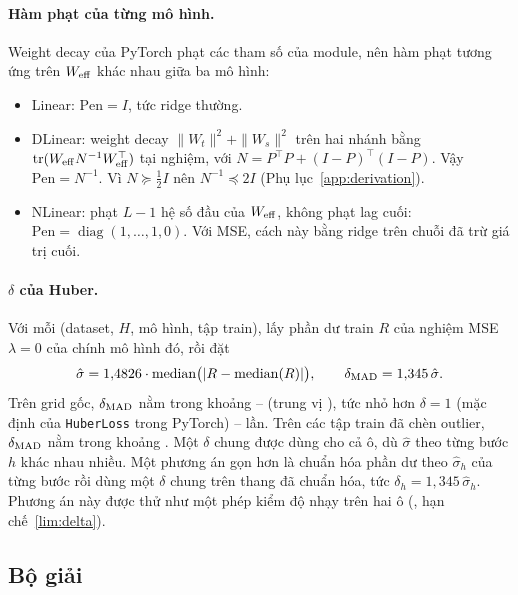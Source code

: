 \paragraph{Hàm phạt của từng mô hình.} Weight decay của PyTorch phạt các tham số của module, nên hàm phạt tương ứng trên $W_{\mathrm{eff}}$ khác nhau giữa ba mô hình:
\begin{itemize}
    \item Linear: $\mathrm{Pen} = I$, tức ridge thường.
    \item DLinear: weight decay $\|W_t\|^2 + \|W_s\|^2$ trên hai nhánh bằng $\operatorname{tr}(W_{\mathrm{eff}} N^{-1} W_{\mathrm{eff}}^\top)$ tại nghiệm, với $N = P^\top P + (I - P)^\top (I - P)$. Vậy $\mathrm{Pen} = N^{-1}$. Vì $N \succeq \tfrac12 I$ nên $N^{-1} \preceq 2I$ (Phụ lục~\ref{app:derivation}).
    \item NLinear: phạt $L - 1$ hệ số đầu của $W_{\mathrm{eff}}$, không phạt lag cuối: $\mathrm{Pen} = \operatorname{diag}(1, \dots, 1, 0)$. Với MSE, cách này bằng ridge trên chuỗi đã trừ giá trị cuối.
\end{itemize}

\paragraph{$\delta$ của Huber.} Với mỗi (dataset, $H$, mô hình, tập train), lấy phần dư train $R$ của nghiệm MSE $\lambda = 0$ của chính mô hình đó, rồi đặt
\begin{equation}
    \hat\sigma = 1{,}4826 \cdot \operatorname{median}\bigl(|R - \operatorname{median}(R)|\bigr), \qquad \delta_{\mathrm{MAD}} = 1{,}345\, \hat\sigma .
\end{equation}
Trên grid gốc, $\delta_{\mathrm{MAD}}$ nằm trong khoảng \nmDeltaMin--\nmDeltaMax{} (trung vị \nmDeltaMedian), tức nhỏ hơn $\delta = 1$ (mặc định của \texttt{HuberLoss} trong PyTorch) \nmDeltaRatioMin--\nmDeltaRatioMax{} lần. Trên các tập train đã chèn outlier, $\delta_{\mathrm{MAD}}$ nằm trong khoảng \nmDeltaOutlierRange. Một $\delta$ chung được dùng cho cả ô, dù $\hat\sigma$ theo từng bước $h$ khác nhau nhiều. Một phương án gọn hơn là chuẩn hóa phần dư theo $\hat\sigma_h$ của từng bước rồi dùng một $\delta$ chung trên thang đã chuẩn hóa, tức $\delta_h = 1{,}345\,\hat\sigma_h$. Phương án này được thử như một phép kiểm độ nhạy trên hai ô (, hạn chế~\ref{lim:delta}).

\subsection{Bộ giải}
\label{sec:method-solvers}

